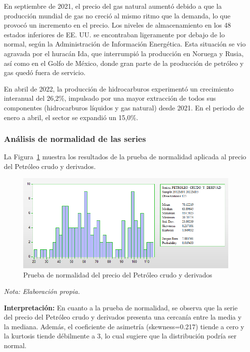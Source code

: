 \documentclass[
  letterpaper,
  DIV=11,
  numbers=noendperiod]{scrartcl}
\begin{document}
En septiembre de 2021, el precio del gas natural aumentó debido a que la
producción mundial de gas no creció al mismo ritmo que la demanda, lo
que provocó un incremento en el precio. Los niveles de almacenamiento en
los 48 estados inferiores de EE. UU. se encontraban ligeramente por
debajo de lo normal, según la Administración de Información Energética.
Esta situación se vio agravada por el huracán Ida, que interrumpió la
producción en Noruega y Rusia, así como en el Golfo de México, donde
gran parte de la producción de petróleo y gas quedó fuera de servicio.

En abril de 2022, la producción de hidrocarburos experimentó un
crecimiento interanual del 26,2\%, impulsado por una mayor extracción de
todos sus componentes (hidrocarburos líquidos y gas natural) desde 2021.
En el periodo de enero a abril, el sector se expandió un 15,0\%.

\hypertarget{anuxe1lisis-de-normalidad-de-las-series}{%
\subsubsection{Análisis de normalidad de las
series}\label{anuxe1lisis-de-normalidad-de-las-series}}

La Figura~\ref{fig-5} muestra los resultados de la prueba de normalidad
aplicada al precio del Petróleo crudo y derivados.

\begin{figure}

\caption{\label{fig-5}Prueba de normalidad del precio del Petróleo crudo
y derivados}

{\centering \includegraphics{20230603090708.png}

}

\end{figure}

\emph{Nota: Elaboración propia.}

\textbf{Interpretación:} En cuanto a la prueba de normalidad, se observa
que la serie del precio del Petróleo crudo y derivados presenta una
cercanía entre la media y la mediana. Además, el coeficiente de
asimetría (skewness=0.217) tiende a cero y la kurtosis tiende débilmente
a 3, lo cual sugiere que la distribución podría ser normal.
\end{document}
